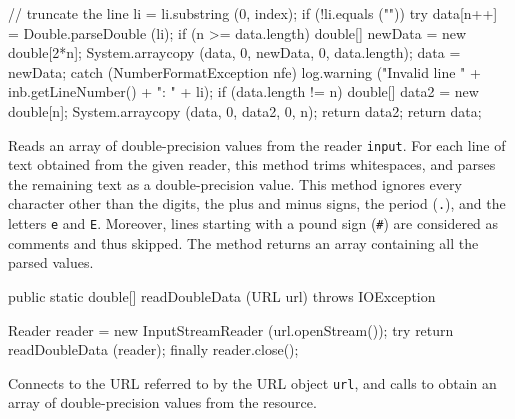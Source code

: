 \begin{code}
\begin{hide}
{{         // truncate the line
         li = li.substring (0, index);
         if (!li.equals ("")) {
            try {
               data[n++] = Double.parseDouble (li);
               if (n >= data.length) {
                  double[] newData = new double[2*n];
                  System.arraycopy (data, 0, newData, 0, data.length);
                  data = newData;
               }
            }
            catch (NumberFormatException nfe) {
               log.warning ("Invalid line " + inb.getLineNumber() + ": " + li);
            }
         }
      }
      if (data.length != n) {
         double[] data2 = new double[n];
         System.arraycopy (data, 0, data2, 0, n);
         return data2;
      }
      return data;
   }\end{hide}
\end{code}
\begin{tabb}   Reads an array of double-precision values from the
 reader \texttt{input}.
 For each line of text obtained from the
 given reader, this method
 trims whitespaces, and parses the
 remaining text as a double-precision value.
 This method ignores every character
 other than the digits, the plus and minus signs,
 the period (\texttt{.}),
 and the letters \texttt{e} and \texttt{E}.
 Moreover, lines starting with a pound sign (\texttt{\#})
 are considered as comments and thus skipped.
 The method returns an array containing
 all the parsed values.
\end{tabb}
\begin{htmlonly}
\end{htmlonly}
\begin{code}

   public static double[] readDoubleData (URL url) throws IOException\begin{hide} {
      Reader reader = new InputStreamReader (url.openStream());
      try {
         return readDoubleData (reader);
      }
      finally {
         reader.close();
      }
   }\end{hide}
\end{code}
\begin{tabb}   Connects to the URL referred to by the URL object \texttt{url},
 and calls  to
 obtain an array of double-precision values from
 the resource.
\end{tabb}
\begin{htmlonly}
\end{htmlonly}
